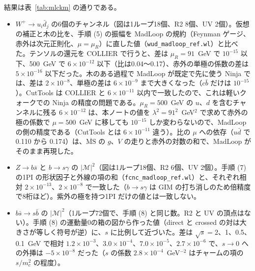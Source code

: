 \documentclass[a4paper,10pt]{ltjsarticle}
\newcommand{\MSbar}{\overline{\mathrm{MS}}}
\begin{document}
結果は表~\ref{tab:mlckm} の通りである。
\begin{itemize}
\item[(a)] $W^+\to u_i\bar d_j$ の6個のチャンネル（図は1ループ18個、R2 8個、UV 2個）。仮想の補正と木の比を、手順 (5) の振幅を MadLoop の規約（Feynman ゲージ、赤外は次元正則化、$\mu=\mu_R$）に直した値（\texttt{wud\_madloop\_ref.wl}）と比べた。テンソルの還元を COLLIER で行うと、差は $\mu_R=91$~GeV で $10^{-15}$ 以下、500~GeV で $6\times10^{-12}$ 以下（比は0.04〜0.17）、赤外の単極の係数の差は $5\times10^{-16}$ 以下だった。木のある過程で MadLoop が既定で先に使う Ninja では、差は $2\times10^{-8}$、単極の差は $6\times10^{-9}$ まで大きくなった（$c\bar b$ だけは $10^{-15}$）。CutTools は COLLIER と $6\times10^{-11}$ 以内で一致したので、これは軽いクォークでの Ninja の精度の問題である。$\mu_R=500$~GeV の $u$、$d$ を含むチャンネルに残る $6\times10^{-12}$ は、本ノートの値を $\lambda^2=91^2$~GeV$^2$ で求めて赤外の極の係数で $\mu=500$~GeV に移しても $10^{-15}$ しか変わらないので、MadLoop の側の精度である（CutTools とは $6\times10^{-11}$ 違う）。比の $\mu$ への依存（$u\bar d$ で 0.110 から 0.174）は、$\MSbar$ の $g$、$V$ の走りと赤外の対数の和で、MadLoop がそのまま再現した。
\item[(b)] $Z\to b\bar s$ と $b\to s\gamma$ の $|\mathcal M|^2$（図は1ループ18個、R2 6個、UV 2個）。手順 (7) の1PI の形状因子と外線の項の和（\texttt{fcnc\_madloop\_ref.wl}）と、それぞれ相対 $2\times10^{-13}$、$2\times10^{-8}$ で一致した（$b\to s\gamma$ は GIM の打ち消しのため倍精度で8桁ほど）。紫外の極を持つ1PI だけの値とは一致しない。
\item[(c)] $b\bar s\to s\bar b$ の $|\mathcal M|^2$（1ループ72個で、手順 (8) と同じ数。R2 と UV の頂点はない）。手順 (8) の運動量0の箱の図から作った値（direct と crossed の対は大きさが等しく符号が逆）に、$s$ に比例して近づいた。差は $\sqrt s=2$、1、0.5、0.1~GeV で相対 $1.2\times10^{-3}$、$3.0\times10^{-4}$、$7.0\times10^{-5}$、$2.7\times10^{-6}$ で、$s\to0$ への外挿は $-5\times10^{-8}$ だった（$s$ の係数 $2.8\times10^{-4}$~GeV$^{-2}$ はチャームの項の $s/m_c^2$ の程度）。

\end{itemize}
\end{document}
